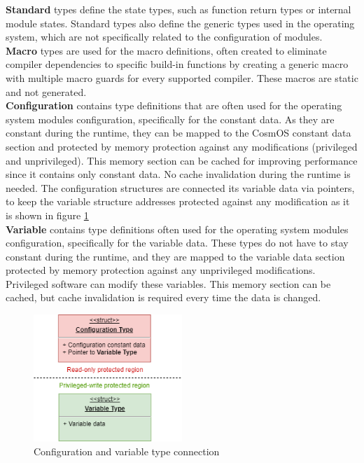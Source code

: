 \textbf{Standard} types define the state types, such as function return types or internal module states. Standard types also define the generic types used in the operating system, which are not specifically related to the configuration of modules.\\

\textbf{Macro} types are used for the macro definitions, often created to eliminate compiler dependencies to specific build-in functions by creating a generic macro with multiple macro guards for every supported compiler. These macros are static and not generated.\\

\textbf{Configuration} contains type definitions that are often used for the operating system modules configuration, specifically for the constant data. As they are constant during the runtime, they can be mapped to the CosmOS constant data section and protected by memory protection against any modifications (privileged and unprivileged). This memory section can be cached for improving performance since it contains only constant data. No cache invalidation during the runtime is needed. The configuration structures are connected its variable data via pointers, to keep the variable structure addresses protected against any modification as it is shown in figure \ref{fig:configurationVariableConnection}\\

\textbf{Variable} contains type definitions often used for the operating system modules configuration, specifically for the variable data. These types do not have to stay constant during the runtime, and they are mapped to the variable data section protected by memory protection against any unprivileged modifications. Privileged software can modify these variables. This memory section can be cached, but cache invalidation is required every time the data is changed.

\begin{figure}[H]
\begin{center}
\includegraphics[width=0.5\textwidth]{images/types.png}
\caption{Configuration and variable type connection}
\label{fig:configurationVariableConnection}
\end{center}
\end{figure}

